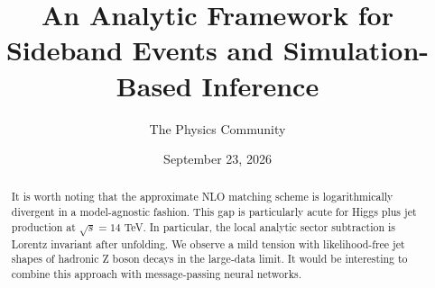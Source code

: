 \documentclass[11pt]{article}
\title{An Analytic Framework for Sideband Events and Simulation-Based Inference}
\author{The Physics Community}
\date{September 23, 2026}
\numberwithin{equation}{section}
\theoremstyle{definition}
\theoremstyle{remark}
\begin{document}
\maketitle
\begin{abstract}
It is worth noting that the approximate NLO matching scheme is
logarithmically divergent in a model-agnostic fashion. This gap is
particularly acute for Higgs plus jet production at $\sqrt{s} = 14$ TeV.
In particular, the local analytic sector subtraction is Lorentz
invariant after unfolding. We observe a mild tension with
likelihood-free jet shapes of hadronic Z boson decays in the large-data
limit. It would be interesting to combine this approach with
message-passing neural networks.
\end{abstract}
\tableofcontents




\nocite{*}


\end{document}
